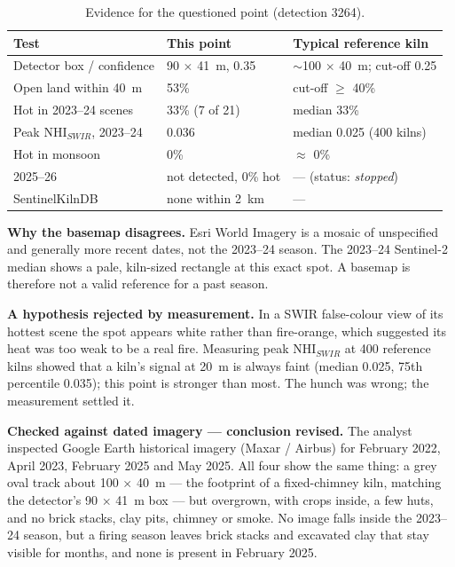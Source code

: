 \documentclass[11pt,a4paper]{article}
\begin{document}
\begin{table}[H]
\centering\small
\begin{tabular}{@{}lll@{}}
\toprule
Test & This point & Typical reference kiln \\
\midrule
Detector box / confidence        & 90 $\times$ 41~m, 0.35 & $\sim$100 $\times$ 40~m; cut-off 0.25 \\
Open land within 40~m            & 53\%                   & cut-off $\geq$ 40\% \\
Hot in 2023--24 scenes           & 33\% (7 of 21)         & median 33\% \\
Peak NHI$_{SWIR}$, 2023--24      & 0.036                  & median 0.025 (400 kilns) \\
Hot in monsoon                   & 0\%                    & $\approx$ 0\% \\
2025--26                         & not detected, 0\% hot  & --- (status: \emph{stopped}) \\
SentinelKilnDB                   & none within 2~km       & --- \\
\bottomrule
\end{tabular}
\caption{Evidence for the questioned point (detection 3264).}
\end{table}

\textbf{Why the basemap disagrees.} Esri World Imagery is a mosaic of
unspecified and generally more recent dates, not the 2023--24 season. The
2023--24 Sentinel-2 median shows a pale, kiln-sized rectangle at this exact
spot. A basemap is therefore not a valid reference for a past season.

\textbf{A hypothesis rejected by measurement.} In a SWIR false-colour view of
its hottest scene the spot appears white rather than fire-orange, which
suggested its heat was too weak to be a real fire. Measuring peak NHI$_{SWIR}$
at 400 reference kilns showed that a kiln's signal at 20~m is always faint
(median 0.025, 75th percentile 0.035); this point is stronger than most. The
hunch was wrong; the measurement settled it.

\textbf{Checked against dated imagery --- conclusion revised.} The analyst
inspected Google Earth historical imagery (Maxar / Airbus) for February 2022,
April 2023, February 2025 and May 2025. All four show the same thing: a grey
oval track about 100 $\times$ 40~m --- the footprint of a fixed-chimney kiln,
matching the detector's 90 $\times$ 41~m box --- but overgrown, with crops
inside, a few huts, and no brick stacks, clay pits, chimney or smoke. No image
falls inside the 2023--24 season, but a firing season leaves brick stacks and
excavated clay that stay visible for months, and none is present in February
2025.
\end{document}
